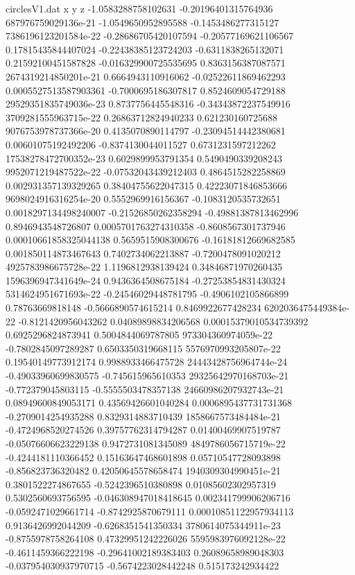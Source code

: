 \begin{filecontents}{circlesV1.dat}
x y z
-1.0583288758102631	-0.20196401315764936	687976759029136e-21
-1.0549650952895588	-0.1453486277315127	7386196123201584e-22
-0.28686705420107594	-0.20577169621106567	0.17815435844407024
-0.22438385123724203	-0.6311838265132071	0.21592100451587828
-0.016329900725535695	0.8363156387087571	2674319214850201e-21
0.6664943110916062	-0.02522611869462293	0.0005527513587903361
-0.7000695186307817	0.8524609054729188	29529351835749036e-23
0.8737756445548316	-0.34343872237549916	3709281555963715e-22
0.26863712824940233	0.621230160725688	9076753978737366e-20
0.4135070890114797	-0.23094514442380681	0.00601075192492206
-0.8374130044011527	0.6731231597212262	17538278472700352e-23
0.6029899953791354	0.5490490339208243	9952071219487522e-22
-0.07532043439212403	0.4864515282258869	0.002931357139329265
0.38404755622047315	0.42223071846853666	9698024916316254e-20
0.5552969916156367	-0.1083120535732651	0.0018297134498240007
-0.21526850262358294	-0.49881387813462996	0.8946943548726807
0.0005701763274310358	-0.8608567301737946	0.00010661858325044138
0.5659515908300676	-0.16181812669682585	0.001850114873467643
0.7402734062213887	-0.7200478091020212	4925783986675728e-22
1.1196812938139424	0.34846871970260435	1596396947341649e-24
0.9436364508675184	-0.27253854831430324	5314624951671693e-22
-0.24546029448781795	-0.4906102105866899	0.78763669818148
-0.5666890574615214	0.8469922677428234	6202036475449384e-22
-0.8121420956043262	0.04089898834206568	0.00015379010534739392
0.6925296824873941	0.5004844069787805	973304360974059e-22
-0.7802845097289287	0.6503350319668115	5576970993205807e-22
0.19540149773912174	0.9988933466475728	24443428756964744e-24
-0.49033960699830575	-0.745615965610353	29325642970168703e-21
-0.772379045803115	-0.5555503478357138	24660986207932743e-21
0.08949600849053171	0.43569426601040284	0.0006895437731731368
-0.2709014254935288	0.8329314883710439	1858667573484484e-21
-0.4724968520274526	0.39757762314794287	0.01400469907519787
-0.05076606623229138	0.9472731081345089	4849786056715719e-22
-0.4244181110366452	0.15163647468601898	0.05710547728093898
-0.856823736320482	0.42050645578658474	1940309304990451e-21
0.3801522274867655	-0.5242396510380898	0.01085602302957319
0.5302560693756595	-0.046308947018418645	0.002341799906206716
-0.0592471029661714	-0.8742925870679111	0.00010851122957934113
0.9136426992044209	-0.6268351541350334	3780614075344911e-23
-0.8755978758264108	0.47329951242226026	5595983976092128e-22
-0.4611459366222198	-0.29641002189383403	0.26089658989048303
-0.037954030937970715	-0.5674223028442248	0.515173242934422

\end{filecontents}

